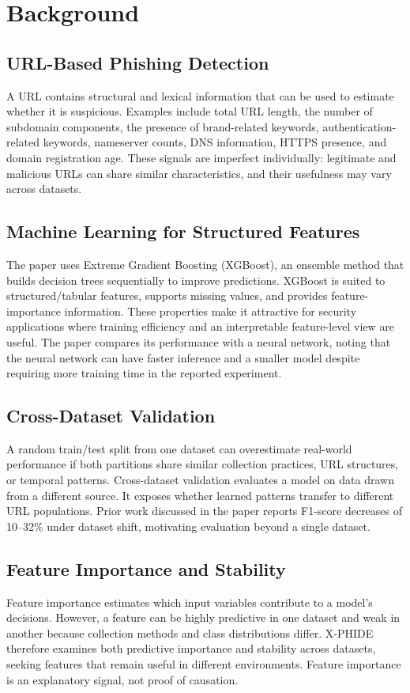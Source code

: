 \chapter{Background}
\setcounter{equation}{0}
\section{URL-Based Phishing Detection}
A URL contains structural and lexical information that can be used to estimate whether it is suspicious. Examples include total URL length, the number of subdomain components, the presence of brand-related keywords, authentication-related keywords, nameserver counts, DNS information, HTTPS presence, and domain registration age. These signals are imperfect individually: legitimate and malicious URLs can share similar characteristics, and their usefulness may vary across datasets.\cite{bib1}

\section{Machine Learning for Structured Features}
The paper uses Extreme Gradient Boosting (XGBoost), an ensemble method that builds decision trees sequentially to improve predictions. XGBoost is suited to structured/tabular features, supports missing values, and provides feature-importance information. These properties make it attractive for security applications where training efficiency and an interpretable feature-level view are useful. The paper compares its performance with a neural network, noting that the neural network can have faster inference and a smaller model despite requiring more training time in the reported experiment.\cite{bib1}

\section{Cross-Dataset Validation}
A random train/test split from one dataset can overestimate real-world performance if both partitions share similar collection practices, URL structures, or temporal patterns. Cross-dataset validation evaluates a model on data drawn from a different source. It exposes whether learned patterns transfer to different URL populations. Prior work discussed in the paper reports F1-score decreases of 10--32\% under dataset shift, motivating evaluation beyond a single dataset.\cite{bib1}

\section{Feature Importance and Stability}
Feature importance estimates which input variables contribute to a model's decisions. However, a feature can be highly predictive in one dataset and weak in another because collection methods and class distributions differ. X-PHIDE therefore examines both predictive importance and stability across datasets, seeking features that remain useful in different environments. Feature importance is an explanatory signal, not proof of causation.
